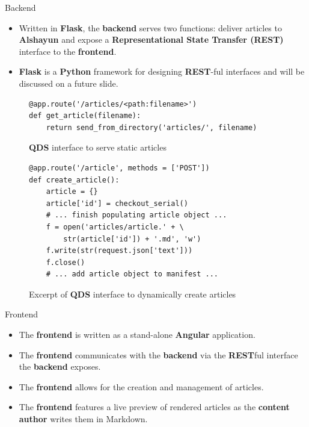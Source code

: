 \documentclass{beamer}
\begin{document}
\begin{frame}{Backend}
    \begin{itemize}
        \item Written in \textbf{Flask}, the \textbf{backend} serves two
            functions: deliver articles to \textbf{Alshayun} and expose a
            \textbf{Representational State Transfer (REST)} interface to the
            \textbf{frontend}.
        \item \textbf{Flask} is a \textbf{Python} framework for designing
            \textbf{REST}-ful interfaces and will be discussed on a future
            slide.
    \end{itemize}
    \begin{figure}
    \begin{verbatim}
@app.route('/articles/<path:filename>')
def get_article(filename):
    return send_from_directory('articles/', filename)
    \end{verbatim}
    \caption{\textbf{QDS} interface to serve static articles}
    \end{figure}
    \begin{figure}
    \begin{verbatim}
@app.route('/article', methods = ['POST'])
def create_article():
    article = {}
    article['id'] = checkout_serial()
    # ... finish populating article object ...
    f = open('articles/article.' + \
        str(article['id']) + '.md', 'w')
    f.write(str(request.json['text']))
    f.close()
    # ... add article object to manifest ...
    \end{verbatim}
    \caption{Excerpt of \textbf{QDS} interface to dynamically create articles}
    \end{figure}
\end{frame}

\begin{frame}{Frontend}
    \begin{itemize}
        \item The \textbf{frontend} is written as a stand-alone \textbf{Angular}
            application.
        \item The \textbf{frontend} communicates with the \textbf{backend} via
            the \textbf{REST}ful interface the \textbf{backend} exposes.
        \item The \textbf{frontend} allows for the creation and management of
            articles.
        \item The \textbf{frontend} features a live preview of rendered articles
            as the \textbf{content author} writes them in Markdown.
    \end{itemize}
\end{frame}
\end{document}
